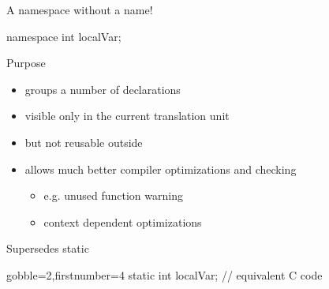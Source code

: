 \begin{advanced}
\begin{frame}[fragile]
  \begin{exampleblock}{A namespace without a name!}
    \begin{cppcode*}{}
      namespace {
        int localVar;
      }
    \end{cppcode*}
  \end{exampleblock}
  \begin{block}{Purpose}
    \begin{itemize}
    \item groups a number of declarations
    \item visible only in the current translation unit
    \item but not reusable outside
    \item allows much better compiler optimizations and checking
      \begin{itemize}
      \item e.g. unused function warning
      \item context dependent optimizations
      \end{itemize}
    \end{itemize}
  \end{block}
  \begin{alertblock}{Supersedes static}
    \begin{cppcode*}{gobble=2,firstnumber=4}
      static int localVar; // equivalent C code
    \end{cppcode*}
  \end{alertblock}
\end{frame}


\end{advanced}
